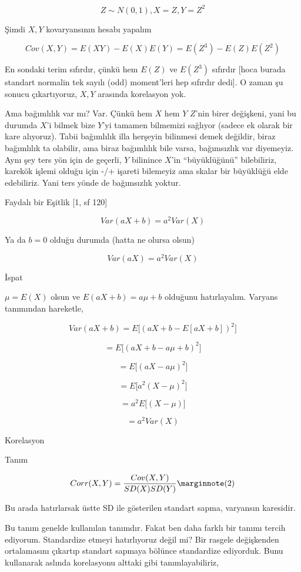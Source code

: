 \documentclass[12pt,fleqn]{article}\usepackage{../../common}
\begin{document}
$$ Z \sim N(0,1), X=Z, Y=Z^2 $$

Şimdi $X,Y$ kovaryansının hesabı yapalım

$$ Cov(X,Y) = E(XY) - E(X)E(Y) = E(Z^3) - E(Z)E(Z^2)$$

En sondaki terim sıfırdır, çünkü hem $E(Z)$ ve $E(Z^3)$ sıfırdır [hoca
burada standart normalin tek sayılı (odd) moment'leri hep sıfırdır dedi]. O
zaman şu sonucu çıkartıyoruz, $X,Y$ arasında korelasyon yok. 

Ama bağımlılık var mı? Var. Çünkü hem $X$ hem $Y$ $Z$'nin birer değişkeni,
yani bu durumda $X$'i bilmek bize $Y$'yi tamamen bilmemizi sağlıyor (sadece
ek olarak bir kare alıyoruz). Tabii bağımlılık illa herşeyin bilinmesi
demek değildir, biraz bağımlılık ta olabilir, ama biraz bağımlılık bile
varsa, bağımsızlık var diyemeyiz. Aynı şey ters yön için de geçerli, $Y$
bilinince $X$'in ``büyüklüğünü'' bilebiliriz, karekök işlemi olduğu için
-/+ işareti bilemeyiz ama skalar bir büyüklüğü elde edebiliriz. Yani ters
yönde de bağımsızlık yoktur. 

Faydalı bir Eşitlik [1, sf 120]

$$ Var(aX+b) = a^2Var(X) $$

Ya da $b=0$ olduğu durumda (hatta ne olursa olsun)

$$ Var(aX) = a^2Var(X) $$

İspat

$\mu = E(X)$ olsun ve  $E(aX + b) = a\mu + b$ olduğunu hatırlayalım. 
Varyans tanımından hareketle, 

$$ Var(aX+b) = E\big[ (aX + b - E[aX+b] )^2 \big] $$

$$ =  E\big[ (aX + b - a\mu + b )^2 \big]  $$

$$ =  E\big[ (aX - a\mu  )^2 \big]  $$

$$ =  E\big[ a^2(X - \mu)^2 \big]  $$

$$ =  a^2 E\big[ (X - \mu) \big]  $$

$$ =  a^2 Var(X) $$


Korelasyon

Tanım

$$ Corr(X,Y) = \frac{Cov(X,Y)}{SD(X)SD(Y)} 
\mlabel{2}
$$

Bu arada hatırlarsak üstte SD ile gösterilen standart sapma, varyansın
karesidir. 

Bu tanım genelde kullanılan tanımdır. Fakat ben daha farklı bir tanımı
tercih ediyorum. Standardize etmeyi hatırlıyoruz değil mi? Bir rasgele
değişkenden ortalamasını çıkartıp standart sapmaya bölünce standardize
ediyorduk. Bunu kullanarak aslında korelasyonu alttaki gibi
tanımlayabiliriz, 
\end{document}
